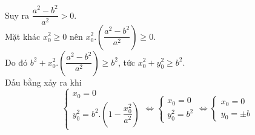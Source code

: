 \begin{bt}
{\begin{enumerate}[a)]
Suy ra $\dfrac{a^2-b^2}{a^2} >0$.\\
Mặt khác $x_0^2 \geq 0$ nên $x_0^2.\left( \dfrac{a^2-b^2}{a^2}\right) \geq 0$.\\
Do đó $b^2 +x_0^2.\left( \dfrac{a^2-b^2}{a^2}\right) \geq b^2$, tức $x_{0}^{2}+y_{0}^{2} \geq b^2.$\\
Dấu bằng xảy ra khi \[\left\{ {\begin{array}{*{20}{c}}
  {{x_0} = 0} \\
  {y_0^2 = {b^2}.\left( {1 - \dfrac{{x_0^2}}{{{a^2}}}} \right)}
\end{array}} \right. \Leftrightarrow \left\{ {\begin{array}{*{20}{c}}
  {{x_0} = 0} \\
  {y_0^2 = {b^2}}
\end{array}} \right. \Leftrightarrow \left\{ {\begin{array}{*{20}{c}}
  {{x_0} = 0} \\
  {{y_0} =  \pm b}
\end{array}} \right.\]


\end{enumerate}}
\end{bt}
